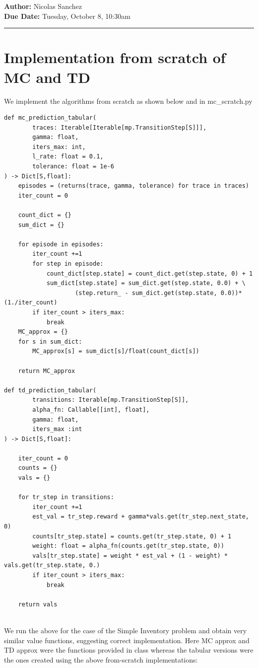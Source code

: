 \documentclass{article}[12pt]
\newcommand{\headings}[4]{\noindent {\bf Assignment 6 CME241} \hfill {{\bf Author:} Nicolas Sanchez} \\
{} \hfill {{\bf Due Date:} #2} \\

\rule[0.1in]{\textwidth}{0.025in}
}
\begin{document}
\headings{\#1}{Tuesday, October 8, 10:30am}\section{} 



\section{Implementation from scratch of MC and TD}
We implement the algorithms from scratch as shown below and in mc\_scratch.py

\begin{lstlisting}
def mc_prediction_tabular(
        traces: Iterable[Iterable[mp.TransitionStep[S]]],
        gamma: float,
        iters_max: int,
        l_rate: float = 0.1,
        tolerance: float = 1e-6
) -> Dict[S,float]:
    episodes = (returns(trace, gamma, tolerance) for trace in traces)
    iter_count = 0

    count_dict = {}
    sum_dict = {}

    for episode in episodes:
        iter_count +=1
        for step in episode:
            count_dict[step.state] = count_dict.get(step.state, 0) + 1
            sum_dict[step.state] = sum_dict.get(step.state, 0.0) + \
                    (step.return_ - sum_dict.get(step.state, 0.0))*(1./iter_count)
        if iter_count > iters_max:
            break
    MC_approx = {}
    for s in sum_dict:
        MC_approx[s] = sum_dict[s]/float(count_dict[s])

    return MC_approx

def td_prediction_tabular(
        transitions: Iterable[mp.TransitionStep[S]],
        alpha_fn: Callable[[int], float],
        gamma: float,
        iters_max :int
) -> Dict[S,float]:

    iter_count = 0
    counts = {}
    vals = {}

    for tr_step in transitions:
        iter_count +=1
        est_val = tr_step.reward + gamma*vals.get(tr_step.next_state, 0)
        counts[tr_step.state] = counts.get(tr_step.state, 0) + 1
        weight: float = alpha_fn(counts.get(tr_step.state, 0))
        vals[tr_step.state] = weight * est_val + (1 - weight) * vals.get(tr_step.state, 0.)
        if iter_count > iters_max:
            break

    return vals
   
\end{lstlisting}
We run the above for the case of the Simple Inventory problem and obtain very similar value functions, suggesting correct implementation. Here MC approx and TD approx were the functions provided in class whereas the tabular versions were the ones created using the above from-scratch implementations:
\end{document}
